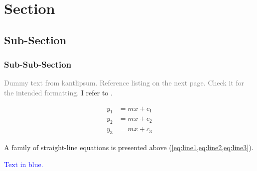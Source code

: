 
\checkBeginRefsection%

\kant[20-21]

\section{Section}
\subsection{Sub-Section}
\subsubsection{Sub-Sub-Section}

\textcolor{gray}{Dummy text from kantlipsum. Reference listing on the next page. Check it for the intended formatting.} I refer to \citep{butin2009education, rudestam2014surviving, Goossens2008g,cassuto2010advising,pires2021teens}. 

\kant[9]


\begin{align}
y_1 & = mx + c_1 
\label{eq:line1} \\
y_2 & = mx + c_2 
\label{eq:line2} \\
y_3 & = mx + c_3 
\label{eq:line3}
\end{align}

A family of straight-line equations is presented above (\cref{eq:line1,eq:line2,eq:line3}).


\kant[10]

\textcolor{blue}{Text in blue.}

\kant[2-5]

\newpage

\checkEndRefsection%
